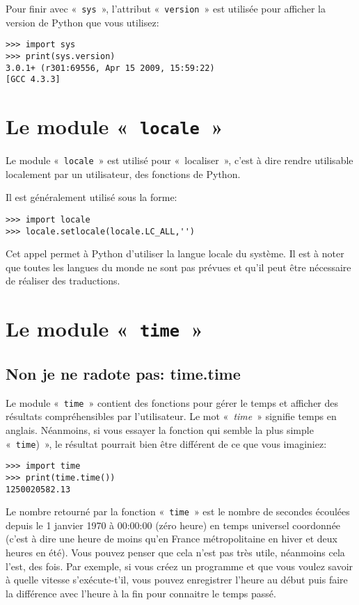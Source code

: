 Pour finir avec « \texttt{sys} », l'attribut « \verb+version+ » est utilisée pour afficher la version de Python que vous utilisez:

\begin{Verbatim}[frame=single,rulecolor=\color{gray}]
>>> import sys
>>> print(sys.version)
3.0.1+ (r301:69556, Apr 15 2009, 15:59:22) 
[GCC 4.3.3]
\end{Verbatim}

\section{Le module « \texttt{locale} »}
Le module « \texttt{locale} » est utilisé pour « localiser », c'est à dire rendre utilisable localement par un utilisateur, des fonctions de Python.

Il est généralement utilisé sous la forme:
\begin{Verbatim}[frame=single,rulecolor=\color{gray}]
>>> import locale
>>> locale.setlocale(locale.LC_ALL,'')
\end{Verbatim}

Cet appel permet à Python d'utiliser la langue locale du système. Il est à noter que toutes les langues du monde ne sont pas prévues et qu'il peut être nécessaire de réaliser des traductions.

\section{Le module « \texttt{time} »}
\subsection{Non je ne radote pas: time.time }

Le module « \texttt{time} » contient des fonctions pour gérer le temps et afficher des résultats compréhensibles par l'utilisateur. Le mot « \emph{time} » signifie temps en anglais. Néanmoins, si vous essayer la fonction qui semble la plus simple « \verb+time+) », le résultat pourrait bien être différent de ce que vous imaginiez:

\begin{Verbatim}[frame=single,rulecolor=\color{gray}]
>>> import time
>>> print(time.time())
1250020582.13
\end{Verbatim}

Le nombre retourné par la fonction « \texttt{time} »  est le nombre de secondes écoulées depuis le 1 janvier 1970 à 00:00:00 (zéro heure) en temps universel coordonnée (c'est à dire une heure de moins qu'en France métropolitaine en hiver et deux heures en été). Vous pouvez penser que cela n'est pas très utile, néanmoins cela l'est, des fois. Par exemple, si vous créez un programme et que vous voulez savoir à quelle vitesse s'exécute-t'il, vous pouvez enregistrer l'heure au début puis faire la différence avec l'heure à la fin pour connaitre le temps passé.

